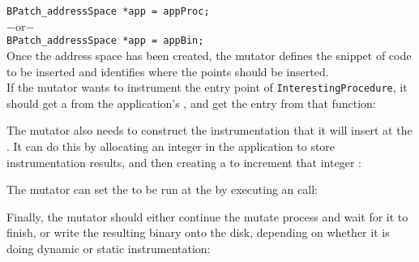 \texttt{BPatch\_addressSpace *app = appProc;}\\
$-$or$-$\\
\texttt{BPatch\_addressSpace *app = appBin;}\\

Once the address space has been created, the mutator defines the snippet of code to be inserted and identifies where the points should be inserted.\\

If the mutator wants to instrument the entry point of \texttt{InterestingProcedure}, it should get a \BPatchfunction from the application’s \BPatchimage, and get the entry \BPatchpoint from that function:


The mutator also needs to construct the instrumentation that it will insert at the \BPatchpoint.  It can do this by allocating an integer in the application to store instrumentation results, and then creating a \BPatchsnippet to increment that integer
:

The mutator can set the \BPatchsnippet to be run at the \BPatchpoint by executing an \insertSnippet call:

Finally, the mutator should either continue the mutate process and wait for it to finish, or write the resulting binary onto the disk, depending on whether it is doing dynamic or static instrumentation:

